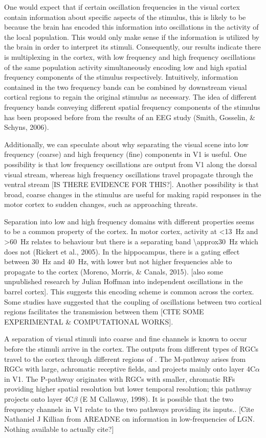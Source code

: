 One would expect that if certain oscillation frequencies in the visual cortex contain information about specific aspects of the stimulus, this is likely to be because the brain has encoded this information into oscillations in the activity of the local population.
This would only make sense if the information is utilized by the brain in order to interpret its stimuli.
Consequently, our results indicate there is multiplexing in the cortex, with low frequency and high frequency oscillations of the same population activity simultaneously encoding low and high spatial frequency components of the stimulus respectively.
Intuitively, information contained in the two frequency bands can be combined by downstream visual cortical regions to regain the original stimulus as necessary.
The idea of different frequency bands conveying different spatial frequency components of the stimulus has been proposed before from the results of an \ac{EEG} study (Smith, Gosselin, \& Schyns, 2006).

Additionally, we can speculate about why separating the visual scene into low frequency (coarse) and high frequency (fine) components in \ac{V1} is useful.
One possibility is that low frequency oscillations are output from \ac{V1} along the dorsal visual stream, whereas high frequency oscillations travel propagate through the ventral stream [IS THERE EVIDENCE FOR THIS?].
Another possibility is that broad, coarse changes in the stimulus are useful for making rapid responses in the motor cortex to sudden changes, such as approaching threats.

Separation into low and high frequency domains with different properties seems to be a common property of the cortex.
In motor cortex, activity at \SI{<13}{Hz} and \SI{>60}{Hz} relates to behaviour but there is a separating band \SI{\approx30}{Hz} which does not (Rickert et al., 2005).
In the hippocampus, there is a gating effect between \SI{30}{Hz} and \SI{40}{Hz}, with lower but not higher frequencies able to propagate to the cortex (Moreno, Morris, \& Canals, 2015).
[also some unpublished research by Julian Hoffman into independent oscillations in the barrel cortex].
This suggests this encoding scheme is common across the cortex.
Some studies have suggested that the coupling of oscillations between two cortical regions facilitates the transmission between them [CITE SOME EXPERIMENTAL \& COMPUTATIONAL WORKS].

A separation of visual stimuli into coarse and fine channels is known to occur before the stimuli arrive in the cortex.
The outputs from different types of \acp{RGC} travel to the cortex through different regions of .
The M-pathway arises from \acp{RGC} with large, achromatic receptive fields, and projects mainly onto layer 4C$\alpha$ in \ac{V1}.
The P-pathway originates with \acp{RGC} with smaller, chromatic \acp{RF} providing higher spatial resolution but lower temporal resolution; this pathway projects onto layer 4C$\beta$ (E M Callaway, 1998).
It is possible that the two frequency channels in \ac{V1} relate to the two pathways providing its inputs..
[Cite Nathaniel J Killian from AREADNE on information in low-frequencies of \ac{LGN}.
Nothing available to actually cite?]

